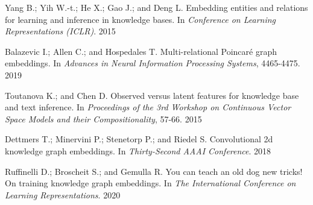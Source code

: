 \documentclass[9pt]{ctexart}
\theoremstyle{definition}
\begin{document}
\hypertarget{Yan15}{Yang B.; Yih W.-t.; He X.; Gao J.; and Deng L. Embedding entities and relations for learning and inference in knowledge bases. In \textit{Conference on Learning Representations (ICLR)}. 2015} 

\hypertarget{Bal19}{Balazevic I.; Allen C.; and Hospedales T. Multi-relational Poincaré graph embeddings. In \textit{Advances in Neural Information Processing Systems}, 4465-4475. 2019} 

\hypertarget{Tou15}{Toutanova K.; and Chen D. Observed versus latent features for knowledge base and text inference. In \textit{Proceedings of the 3rd Workshop on Continuous Vector Space Models and their Compositionality}, 57-66. 2015}

\hypertarget{Det18}{Dettmers T.; Minervini P.; Stenetorp P.; and Riedel S. Convolutional 2d knowledge graph embeddings. In \textit{Thirty-Second AAAI Conference}. 2018}

\hypertarget{Ruf20}{Ruffinelli D.; Broscheit S.; and Gemulla R. You can teach an old dog new tricks! On training knowledge graph embeddings. In \textit{The International Conference on Learning Representations}. 2020}
\end{document}
